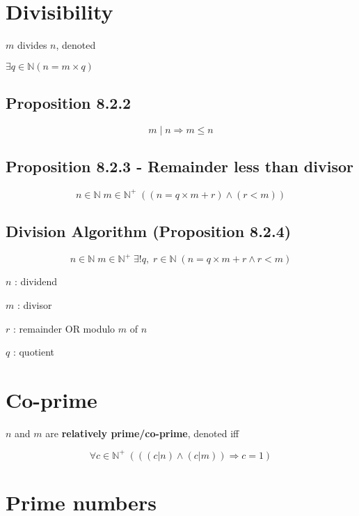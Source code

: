 \documentclass[12pt]{article}
\begin{document}
\begin{spacing}{1.5}
\section{Divisibility}

$m$ divides $n$, denoted 

$\exists q \in \mathbb{N} (n = m \times q)$ 

\subsection{Proposition 8.2.2}

$$m \; | \; n \Rightarrow m \le n$$

\subsection{Proposition 8.2.3 - Remainder less than divisor}

$$n \in \mathbb{N} \; 
m \in \mathbb{N}^+ \; 
((n = q \times m + r) \wedge (r < m))$$

\subsection{Division Algorithm (Proposition 8.2.4)}

$$n \in \mathbb{N} \;
m \in \mathbb{N}^+ \;
\exists ! q, \; r \in \mathbb{N} \; 
(n = q \times m + r \wedge r < m)$$

\begin{itemize*}
	\item $n$ : dividend
	\item $m$ : divisor
	\item $r$ : remainder OR modulo $m$ of $n$
	\item $q$ : quotient 
\end{itemize*}

\section{Co-prime}

$n$ and $m$ are \textbf{relatively prime/co-prime}, denoted  iff

$$\forall c \in \mathbb{N}^+ \; 
(
((c | n) \wedge (c | m)) \Rightarrow c = 1
)$$ 

\section{Prime numbers}


\end{spacing}
\end{document}
